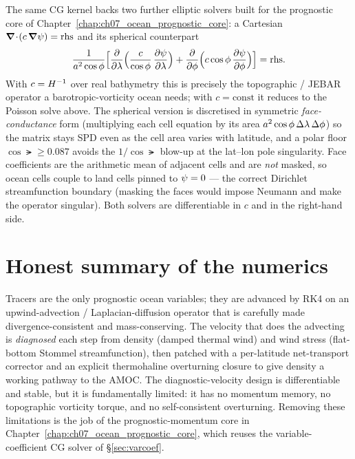 The same CG kernel backs two further elliptic solvers built for the prognostic core
of Chapter~\ref{chap:ch07_ocean_prognostic_core}: a Cartesian
$\boldsymbol{\nabla}\!\cdot\!(c\,\boldsymbol{\nabla}\psi)=\text{rhs}$ and its spherical counterpart
\begin{equation}
  \frac{1}{a^2\cos\phi}\Big[\frac{\partial }{\partial \lambda}\Big(\frac{c}{\cos\phi}\,\frac{\partial \psi}{\partial \lambda}\Big)
  + \frac{\partial }{\partial \phi}\Big(c\cos\phi\,\frac{\partial \psi}{\partial \phi}\Big)\Big] = \text{rhs}.
  \label{eq:sphere-elliptic}
\end{equation}
With $c=H^{-1}$ over real bathymetry this is precisely the topographic / JEBAR
operator a barotropic-vorticity ocean needs; with $c=\text{const}$ it reduces to the
Poisson solve above. The spherical version is discretised in symmetric
\emph{face-conductance} form (multiplying each cell equation by its area
$a^2\cos\phi\,\Delta\lambda\,\Delta\phi$) so the matrix stays SPD even as the cell
area varies with latitude, and a polar floor $\cos\lat\ge 0.087$ avoids the
$1/\cos\lat$ blow-up at the lat--lon pole singularity. Face coefficients are the
arithmetic mean of adjacent cells and are \emph{not} masked, so ocean cells couple to
land cells pinned to $\psi=0$ --- the correct Dirichlet streamfunction boundary
(masking the faces would impose Neumann and make the operator singular). Both solvers
are differentiable in $c$ and in the right-hand side.

\section{Honest summary of the numerics}

Tracers are the only prognostic ocean variables; they are advanced by RK4 on an
upwind-advection / Laplacian-diffusion operator that is carefully made
divergence-consistent and mass-conserving. The velocity that does the advecting is
\emph{diagnosed} each step from density (damped thermal wind) and wind stress
(flat-bottom Stommel streamfunction), then patched with a per-latitude net-transport
corrector and an explicit thermohaline overturning closure to give density a working
pathway to the AMOC. The diagnostic-velocity design is differentiable and stable, but
it is fundamentally limited: it has no momentum memory, no topographic vorticity
torque, and no self-consistent overturning. Removing these limitations is the job of
the prognostic-momentum core in Chapter~\ref{chap:ch07_ocean_prognostic_core}, which
reuses the variable-coefficient CG solver of \S\ref{sec:varcoef}.

